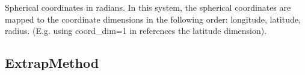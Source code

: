 \documentclass[letterpaper,10pt,english]{sphinxmanual}
\begin{document}
\begin{fulllineitems}
\begin{fulllineitems}
\end{fulllineitems}


\begin{fulllineitems}
\label{\detokenize{CoordSys:ESMF.api.constants.CoordSys.SPH_RAD}}
Spherical coordinates in radians. In this system, the spherical
coordinates are mapped to the {\hyperref[\detokenize{grid:ESMF.api.grid.Grid}]{}} coordinate dimensions in the
following order: longitude, latitude, radius. (E.g. using
coord\_dim=1 in {\hyperref[\detokenize{grid:ESMF.api.grid.Grid.get_coords}]{}} references the latitude dimension).

\end{fulllineitems}


\end{fulllineitems}



\subsection{ExtrapMethod}
\label{\detokenize{ExtrapMethod:extrapmethod}}\label{\detokenize{ExtrapMethod::doc}}
\end{document}
